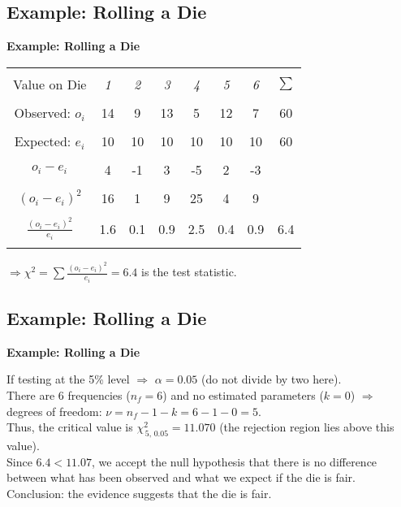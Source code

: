 \documentclass[compress]{beamer}        %
\makeatletter
\newcommand{\tcb}{\textcolor{beamer@blendedblue}}
\makeatother
\begin{document}
\subsection{Example: Rolling a Die}
\begin{frame}{\bf \tcb{Example: Rolling a Die}}


\begin{center}
\begin{tabular}{|c|cccccc|c|}
\hline
&&&&&&&\\[-0.3cm]
Value on Die      & \emph{1} & \emph{2} & \emph{3} & \emph{4} & \emph{5} & \emph{6} & $\sum$ \\[0.1cm]
\hline
&&&&&&&\\[-0.3cm]
Observed: $o_i$ & 14 & 9 & 13 & 5 & 12 & 7 & 60 \\[0.1cm]
\hline
&&&&&&&\\[-0.3cm]
Expected: $e_i$ & 10 & 10 & 10 & 10 & 10 & 10 & 60 \\[0.1cm]
\hline
&&&&&&&\\[-0.3cm]
$o_i-e_i$ & 4 & -1 & 3 & -5 & 2 & -3 &  \\[0.1cm]
\hline
&&&&&&&\\[-0.3cm]
$(o_i-e_i)^2$ & 16 & 1 & 9 & 25 & 4 & 9 &  \\[0.1cm]
\hline
&&&&&&&\\[-0.3cm]
$\frac{(o_i-e_i)^2}{e_i}$ & 1.6 & 0.1 & 0.9 & 2.5 & 0.4 & 0.9 & 6.4 \\[0.1cm]
\hline
\multicolumn{7}{c}{}\\[-0.3cm]
\end{tabular}
\end{center}

$\Rightarrow \chi^2 = \sum \frac{(o_i-e_i)^2}{e_i} = 6.4$ is the test statistic.


\end{frame}



\subsection{Example: Rolling a Die}
\begin{frame}{\bf \tcb{Example: Rolling a Die}}

If testing at the 5\% level $\Rightarrow$ $\alpha = 0.05$ (do not divide by two here).\\[0.7cm]

There are 6 frequencies ($n_f=6$) and no estimated parameters ($k=0$) $\Rightarrow$ degrees of freedom: $\nu = n_f - 1 - k = 6 - 1 - 0 =5$.\\[0.7cm]

Thus, the critical value is $\chi^2_{\,5,\,0.05} = 11.070$ (the rejection region lies above this value).\\[0.7cm]

Since $6.4 < 11.07$, we accept the null hypothesis that there is no difference between what has been observed and what we expect if the die is fair.\\[0.7cm]

Conclusion: the evidence suggests that the die is fair.

\end{frame}
\end{document}
